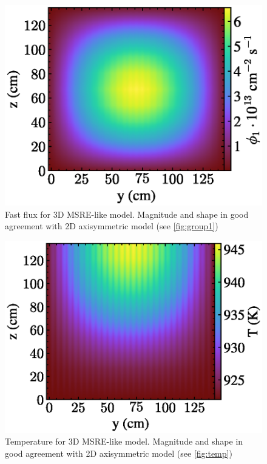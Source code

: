 \documentclass{article}
\begin{document}
\begin{figure}[htpb]
  \centering
  \includegraphics{3d_gamma_heating_group1.eps}
        \caption{Fast flux for 3D \gls{MSRE}-like model. Magnitude and shape in
          good agreement with 2D axisymmetric model (see \cref{fig:group1})}
  \label{fig:3d_group1}
\end{figure}

\begin{figure}[htpb]
  \centering
  \includegraphics{3d_gamma_heating_temp.eps}
        \caption{Temperature for 3D \gls{MSRE}-like model. Magnitude and shape in
          good agreement with 2D axisymmetric model (see \cref{fig:temp})}
  \label{fig:3d_temp}
\end{figure}
\end{document}
